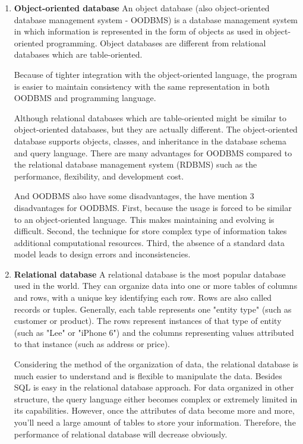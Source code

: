 \begin{enumerate}
		
	\item\textbf{Object-oriented database}
	\setlength{\parindent}{1em}		
	An object database (also object-oriented database management system - OODBMS) is a database management system in which information is represented in the form of objects as used in object-oriented programming.
	Object databases are different from relational databases which are table-oriented.
	
	Because of tighter integration with the object-oriented language, the program is easier to maintain consistency with the same representation in both OODBMS and programming language.
	
	Although relational databases which are table-oriented might be similar to object-oriented databases, but they are actually different.
	The object-oriented database supports objects, classes, and inheritance in the database schema and query language.
	There are many advantages for OODBMS compared to the relational database management system (RDBMS) such as the performance, flexibility, and development cost.
	
	And OODBMS also have some disadvantages, the have mention 3 disadvantages for OODBMS.
	First, because the usage is forced to be similar to an object-oriented language.
	This makes maintaining and evolving is difficult.
	Second, the technique for store complex type of information takes additional computational resources.
	Third, the absence of a standard data model leads to design errors and inconsistencies.
		
	\item\textbf{Relational database}
	\setlength{\parindent}{1em}	
	A relational database is the most popular database used in the world.
	They can organize data into one or more tables of columns and rows, with a unique key identifying each row.
	Rows are also called records or tuples.
	Generally, each table represents one "entity type" (such as customer or product).
	The rows represent instances of that type of entity (such as "Lee" or "iPhone 6") and the columns representing values attributed to that instance (such as address or price).
	
	Considering the method of the organization of data, the relational database is much easier to understand and is flexible to manipulate the data.
	Besides SQL is easy in the relational database approach.
	For data organized in other structure, the query language either becomes complex or extremely limited in its capabilities.
	However, once the attributes of data become more and more, you'll need a large amount of tables to store your information.
	Therefore, the performance of relational database will decrease obviously.
		

\end{enumerate}
